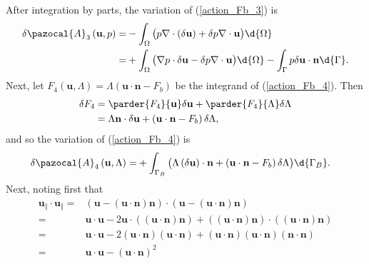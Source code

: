 After integration by parts, the variation of (\ref{action_Fb_3}) is 
\begin{align}
  \delta \pazocal{A}_3 \left(\mathbf{u}, p \right) = &- \int_{\Omega} \big( p \nabla \cdot \left( \delta \mathbf{u} \right) + \delta p \nabla \cdot \mathbf{u} \big) \d{\Omega} \notag \\
  \label{action_variation_Fb_3}
  = & + \int_{\Omega} \big( \nabla p \cdot \delta \mathbf{u} - \delta p \nabla \cdot \mathbf{u} \big) \d{\Omega} - \int_{\Gamma} p \delta \mathbf{u} \cdot \mathbf{n} \d{\Gamma}.
\end{align}
Next, let $F_4 (\mathbf{u}, \Lambda) = \Lambda \left( \mathbf{u} \cdot \mathbf{n} - F_b \right)$ be the integrand of (\ref{action_Fb_4}).
Then
\begin{align*}
  \delta F_4 &= \parder{F_4}{\mathbf{u}} \delta \mathbf{u} + \parder{F_4}{\Lambda} \delta \Lambda \\
  &= \Lambda \mathbf{n} \cdot \delta \mathbf{u} + \left( \mathbf{u} \cdot \mathbf{n} - F_b \right) \delta \Lambda,
\end{align*}
and so the variation of (\ref{action_Fb_4}) is
\begin{align}
  \label{action_variation_Fb_4}
  \delta \pazocal{A}_4 \left(\mathbf{u}, \Lambda \right) = &+ \int_{\Gamma_B} \big( \Lambda \left( \delta \mathbf{u} \right) \cdot \mathbf{n} + \left( \mathbf{u} \cdot \mathbf{n} - F_b \right) \delta \Lambda \big) \d{\Gamma_B}.
\end{align}
Next, noting first that
\begin{align*}
  \mathbf{u}_{\Vert} \cdot \mathbf{u}_{\Vert} = & \left( \mathbf{u} - \left( \mathbf{u} \cdot \mathbf{n} \right) \mathbf{n} \right) \cdot \left( \mathbf{u} - \left( \mathbf{u} \cdot \mathbf{n} \right) \mathbf{n} \right) \\
  = & \mathbf{u} \cdot \mathbf{u} - 2 \mathbf{u} \cdot \left( \left( \mathbf{u} \cdot \mathbf{n} \right) \mathbf{n} \right) + \left( \left( \mathbf{u} \cdot \mathbf{n} \right) \mathbf{n} \right) \cdot \left( \left( \mathbf{u} \cdot \mathbf{n} \right) \mathbf{n} \right) \\
  = & \mathbf{u} \cdot \mathbf{u} - 2 \left( \mathbf{u} \cdot \mathbf{n} \right) \left( \mathbf{u} \cdot \mathbf{n} \right) + \left( \mathbf{u} \cdot \mathbf{n} \right) \left( \mathbf{u} \cdot \mathbf{n} \right) \left( \mathbf{n} \cdot \mathbf{n} \right) \\
  = & \mathbf{u} \cdot \mathbf{u} - \left( \mathbf{u} \cdot \mathbf{n} \right)^2
\end{align*}
